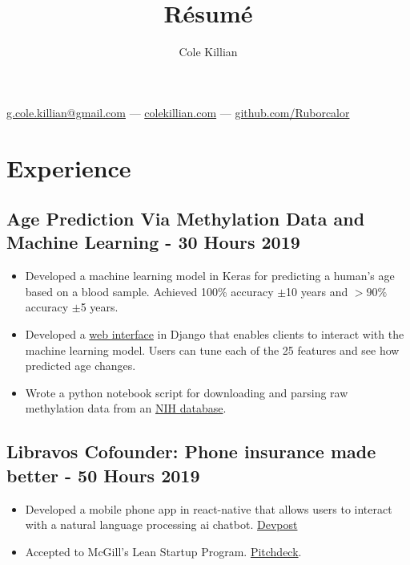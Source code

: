 \documentclass{article}
\makeatletter
\renewcommand{\maketitle}{
\begin{center}
{\color{green}\huge\bfseries
\theauthor}

\vspace{.25em}
\href{mailto:g.cole.killian@gmail.com}{g.cole.killian@gmail.com} --- \href{https://colekillian.com}{colekillian.com} --- \href{https://github.com/Ruborcalor}{github.com/Ruborcalor} 
\end{center}
}
\makeatother
\begin{document}
\title{R\'esum\'e}
\author{Cole Killian}

\maketitle

\section{Experience}

\subsection{Age Prediction Via Methylation Data and Machine Learning - 30 Hours \hfill 2019}
\begin{itemize}[leftmargin=0.5in]
  \setlength\itemsep{0.00em}
  \item Developed a machine learning model in Keras for predicting a human's age based on a blood sample. Achieved 100\% accuracy $\pm$10 years and $>90\%$ accuracy $\pm$5 years.
  \item Developed a \href{https://colekillian.com/methylation}{web interface} in Django that enables clients to interact with the machine learning model. Users can tune each of the 25 features and see how predicted age changes.
  \item Wrote a python notebook script for downloading and parsing raw methylation data from an \href{https://www.ncbi.nlm.nih.gov/geo/query/acc.cgi?acc=GSE87571}{NIH database}.
\end{itemize}

\subsection{Libravos Cofounder: Phone insurance made better - 50 Hours \hfill 2019}
\begin{itemize}[leftmargin=0.5in]
  \setlength\itemsep{0.00em}
\item Developed a mobile phone app in react-native that allows users to interact with a natural language processing ai chatbot. \href{https://devpost.com/software/libravos-mobile-app-with-chat-bot}{Devpost}
\item Accepted to McGill's Lean Startup Program. \href{https://docs.google.com/presentation/d/1Ir94rF139ZDfdj1Fh7WFZHXL2-eSZWI6ACdJVupn5Pg/edit?usp=sharing}{Pitchdeck}.
\end{itemize}
\end{document}
